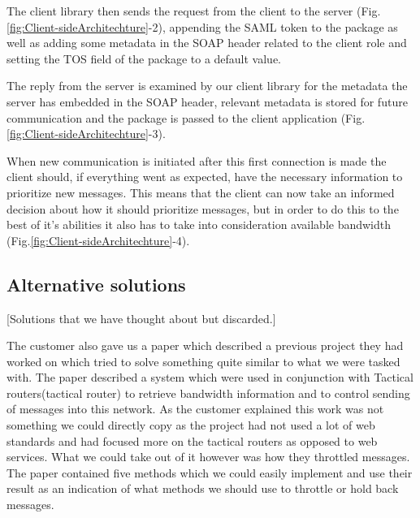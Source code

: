         The client library then sends the request from the client to the server (Fig.\ref{fig:Client-sideArchitechture}-2), appending the SAML token to the package as well as adding some metadata in the SOAP header related to the client role and setting the TOS field of the package to a default value.

        The reply from the server is examined by our client library for the metadata the server has embedded in the SOAP header, relevant metadata is stored for future communication and the package is passed to the client application (Fig.\ref{fig:Client-sideArchitechture}-3).

        When new communication is initiated after this first connection is made the client should, if everything went as expected, have the necessary information to prioritize new messages. This means that the client can now take an informed decision about how it should prioritize messages, but in order to do this to the best of it’s abilities it also has to take into consideration available bandwidth (Fig.\ref{fig:Client-sideArchitechture}-4).
    
           
    \subsection{Alternative solutions}\label{Alternative solutions} [Solutions that we have thought about but discarded.]

        The customer also gave us a paper\cite{soa-qos-pdf} which described a previous project they had worked on which tried to solve something quite similar to what we were tasked with. The paper described a system which were used in conjunction with Tactical routers(\gls{tactical router}) to retrieve bandwidth information and to control sending of messages into this network. As the customer explained this work was not something we could directly copy as the project had not used a lot of web standards and had focused more on the tactical routers as opposed to web services. What we could take out of it however was how they throttled messages. The paper contained five methods which we could easily implement and use their result as an indication of what methods we should use to throttle or hold back messages.

